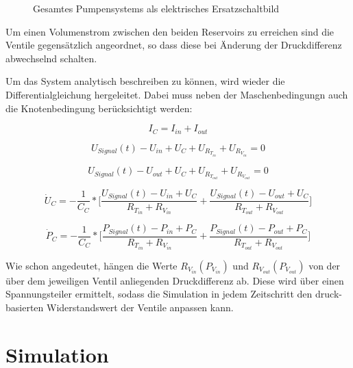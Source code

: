 \documentclass[fontsize=12pt, a4paper]{scrartcl}
\begin{document}
\begin{figure}[H]
	
	\caption{Gesamtes Pumpensystems als elektrisches Ersatzschaltbild}
	\label{systemcircuit}
\end{figure}

Um einen Volumenstrom zwischen den beiden Reservoirs zu erreichen sind die Ventile gegensätzlich angeordnet, so dass diese bei Änderung der Druckdifferenz abwechselnd schalten. 

Um das System analytisch beschreiben zu können, wird wieder die Differentialgleichung hergeleitet. Dabei muss neben der Maschenbedingungn auch die Knotenbedingung berücksichtigt werden:

\begin{equation}
	I_{C} = I_{in} + I_{out}
\end{equation}

\begin{equation}
	U_{Signal}(t) - U_{in} + U_{C} + U_{R_{T_{in}}} + U_{R_{V_{in}}} = 0
\end{equation}

\begin{equation}
	U_{Signal}(t) - U_{out} + U_{C} + U_{R_{T_{out}}} + U_{R_{V_{out}}} = 0
\end{equation}

\begin{equation}
	\dot{U}_{C} = - \frac{1}{C_{C}} * \biggl[\frac{U_{Signal}(t)-U_{in}+U_{C}}{R_{T_{in}}+R_{V_{in}}} + \frac{U_{Signal}(t)-U_{out}+U_{C}}{R_{T_{out}}+R_{V_{out}}}\biggr]
\end{equation}

\begin{equation}
	\dot{P}_{C} = - \frac{1}{C_{C}} * \biggl[\frac{P_{Signal}(t)-P_{in}+P_{C}}{R_{T_{in}}+R_{V_{in}}} + \frac{P_{Signal}(t)-P_{out}+P_{C}}{R_{T_{out}}+R_{V_{out}}}\biggr]
\end{equation}

Wie schon angedeutet, hängen die Werte $R_{V_{in}}(P_{V_{in}})$ und $R_{V_{out}}(P_{V_{out}})$ von der über dem jeweiligen Ventil anliegenden Druckdifferenz ab. Diese wird über einen Spannungsteiler ermittelt, sodass die Simulation in jedem Zeitschritt den druck-basierten Widerstandswert der Ventile anpassen kann.

\section{Simulation}
\end{document}
